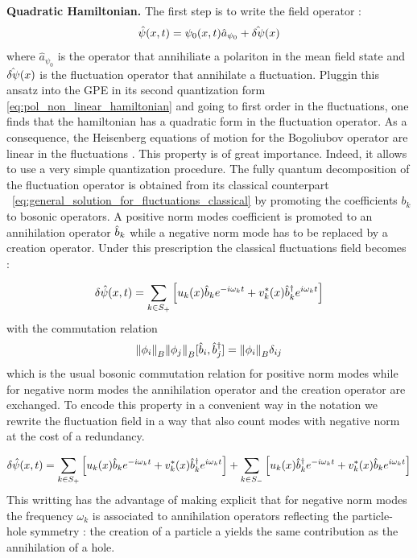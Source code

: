 \textbf{Quadratic Hamiltonian.} The first step is to write the field operator : 
\begin{equation}
    \hat{\psi}(x,t)= \psi_0(x,t)\hat{a}_{\psi_0}+\hat{\delta\psi}(x)
\end{equation}
where $\hat{a}_{\psi_0}$ is the operator that annihiliate a polariton in the mean field state and $\hat{\delta\psi}(x)$ is the fluctuation operator that 
annihilate a fluctuation. Pluggin this ansatz into the GPE in its second quantization form \ref{eq:pol_non_linear_hamiltonian} and going to first order in the fluctuations, one
finds that the hamiltonian has a quadratic form in the fluctuation operator. As a consequence, the Heisenberg
equations of motion for the Bogoliubov operator are linear in the fluctuations \cite{castin_bose-einstein_2001}. This property is of great importance.
Indeed, it allows to use a very simple quantization procedure. The fully quantum decomposition of the 
fluctuation operator is obtained from its classical counterpart ~\ref{eq:general_solution_for_fluctuations_classical} by promoting the coefficients $b_k$ to bosonic operators. A positive norm modes coefficient
is promoted to an annihilation operator $\hat{b}_k$ while a negative norm mode has to be replaced by a creation operator. Under this prescription
the classical fluctuations field becomes :

\begin{equation}
    \delta\hat{\psi}(x,t) =\sum_{k\in S_+}\left[u_k(x)\hat{b}_k e^{-i\omega_k t}+ v^*_k(x)\hat{b}_k^\dagger e^{i\omega_k t}\right]
\end{equation}
with the commutation relation 
\begin{equation}
    \norm{\phi_i}_B\norm{\phi_j}_B[\hat{b}_i, \hat{b}_j^\dagger]  = \norm{\phi_i}_B\delta_{ij}
\end{equation}
which is the usual bosonic commutation relation for positive norm modes while for negative norm modes the annihilation operator and the creation operator are exchanged. To encode this property in a convenient way in the notation we rewrite the fluctuation field in a way that also count modes with negative 
norm at the cost of a redundancy.

\begin{equation}
    \delta\hat{\psi}(x,t) =\sum_{k\in S_+}\left[u_k(x)\hat{b}_k e^{-i\omega_k t}+ v^*_k(x)\hat{b}_k^\dagger e^{i\omega_k t}\right] + \sum_{k\in S_-}\left[u_k(x)\hat{b}_k^\dagger e^{-i\omega_k t}+ v^*_k(x)\hat{b}_k e^{i\omega_k t}\right]
    \label{eq:fluctuation_field_local_modes}
\end{equation}
This writting has the advantage of making explicit that for negative norm modes the frequency $\omega_k$ is associated to annihilation operators reflecting the particle-hole symmetry :
the creation of a particle a yields the same contribution as the annihilation of a hole.



